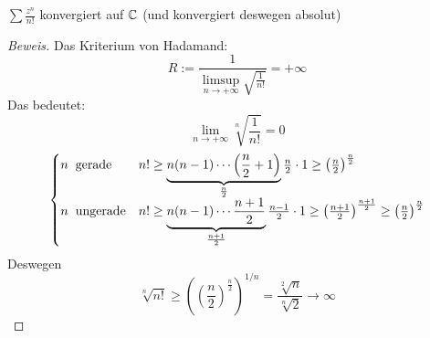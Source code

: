 \begin{Bem}
  $\sum \frac{z^n}{n!}$ konvergiert auf $\mathbb{C}$ (und konvergiert deswegen absolut)
\end{Bem}
\begin{proof}[Beweis]
  Das Kriterium von Hadamand:
  \[R:=\frac{1}{\limsup_{n\to+\infty}\sqrt{\frac{1}{n!}}}=+\infty\]
  Das bedeutet:
  \[\lim_{n\to +\infty}\sqrt[n]{\frac{1}{n!}}=0\]
  \[\begin{cases}
    n\hspace{2mm}\text{gerade}& n!\geq \underbrace{n(n-1)\cdots \left(\frac{n}{2}+1\right)}_{\frac{n}{2}}
\frac{n}{2}\cdot 1 \geq \left(\frac{n}{2}\right)^{\frac{n}{2}}\\
    n\hspace{2mm}\text{ungerade}& n!\geq \underbrace{n(n-1)\cdots \frac{n+1}{2}}_{\frac{n+1}{2}}\frac{n-1}{2}\cdot 1
\geq \left(\frac{n+1}{2}\right)^{\frac{n+1}{2}}\geq \left(\frac{n}{2}\right)^{\frac{n}{2}}\\
  \end{cases}\]
Deswegen
  \[\sqrt[n]{n!}\geq\left(\left(\frac{n}{2}\right)^{\frac{n}{2}}\right)^{1/n}
= \frac{\sqrt[2]{n}}{\sqrt[n]{2}} \to \infty\]
\end{proof}
